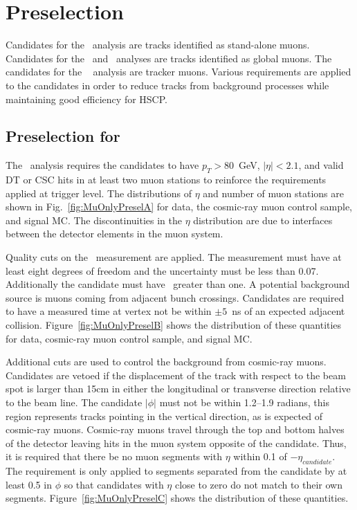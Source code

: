 \section{Preselection \label{sec:preselection}}
Candidates for the \muononly\ analysis are tracks identified as stand-alone muons. Candidates for the \tktof\ and \multi\ analyses are tracks identified
as global muons. The candidates for the \tkonly\
analysis are tracker muons.
Various requirements are applied to the candidates in order to reduce tracks from background processes while maintaining good efficiency for HSCP.

\subsection{Preselection for \muononly\ \label{sec:muonlypreselection}}

The \muononly\ analysis requires the candidates to have $p_T > 80$~GeV, $|\eta| < 2.1$, and valid DT or CSC hits in at least two muon stations
to reinforce the requirements applied at trigger level. 
The distributions of $\eta$ and number of muon stations are shown in Fig.~\ref{fig:MuOnlyPreselA} for data, the cosmic-ray muon control sample, and signal MC.
The discontinuities in the $\eta$ distribution are due to interfaces between the detector elements in the muon system.

Quality cuts on the \invbeta\ measurement are applied. The measurement must have at least eight degrees of freedom and the uncertainty must be less than 0.07.
Additionally the candidate must have \invbeta\ greater than one.
A potential background source is muons coming from adjacent bunch crossings.
Candidates are required to have a measured time at vertex not be within $\pm5$~ns of an expected adjacent collision.
Figure~\ref{fig:MuOnlyPreselB} shows the distribution of these quantities for data, cosmic-ray muon control sample, and signal MC.

Additional cuts are used to control the background from cosmic-ray muons. Candidates are vetoed if the displacement of the track
with respect to the beam spot is larger than 15cm in either the longitudinal or transverse direction relative to the beam line. 
The candidate $|\phi|$ must not be within 1.2--1.9 radians, this region represents tracks pointing in the vertical
direction, as is expected of cosmic-ray muons. Cosmic-ray muons travel 
through the top and bottom halves of the detector leaving hits in the muon system opposite of the candidate.
Thus, it is required that  there be no muon segments with $\eta$ within 0.1 of $-\eta_{candidate}$. The requirement is only applied to 
segments separated from the candidate by at least 0.5 in $\phi$ so that candidates with $\eta$ close to zero do not match to their own segments.
Figure~\ref{fig:MuOnlyPreselC} shows the distribution of these quantities.

